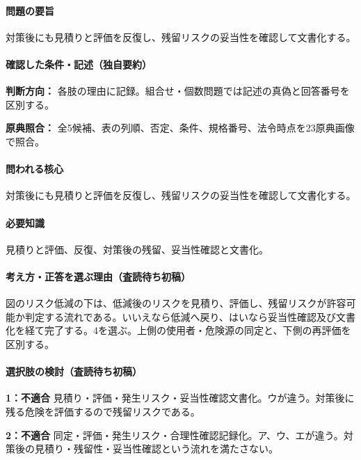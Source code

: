 \paragraph{問題の要旨} 対策後にも見積りと評価を反復し、残留リスクの妥当性を確認して文書化する。

\paragraph{確認した条件・記述（独自要約）}\mbox{}\par

\noindent\textbf{判断方向：} 各肢の理由に記録。組合せ・個数問題では記述の真偽と回答番号を区別する。\par

\noindent\textbf{原典照合：} 全5候補、表の列順、否定、条件、規格番号、法令時点を23原典画像で照合。\par

\paragraph{問われる核心} 対策後にも見積りと評価を反復し、残留リスクの妥当性を確認して文書化する。

\paragraph{必要知識} 見積りと評価、反復、対策後の残留、妥当性確認と文書化。

\paragraph{考え方・正答を選ぶ理由（査読待ち初稿）} 図のリスク低減の下は、低減後のリスクを見積り、評価し、残留リスクが許容可能か判定する流れである。いいえなら低減へ戻り、はいなら妥当性確認及び文書化を経て完了する。4を選ぶ。上側の使用者・危険源の同定と、下側の再評価を区別する。

\paragraph{選択肢の検討（査読待ち初稿）}\mbox{}\par

\noindent\textbf{1：不適合} 見積り・評価・発生リスク・妥当性確認文書化。ウが違う。対策後に残る危険を評価するので残留リスクである。\par

\noindent\textbf{2：不適合} 同定・評価・発生リスク・合理性確認記録化。ア、ウ、エが違う。対策後の見積り・残留性・妥当性確認という流れを満たさない。\par

